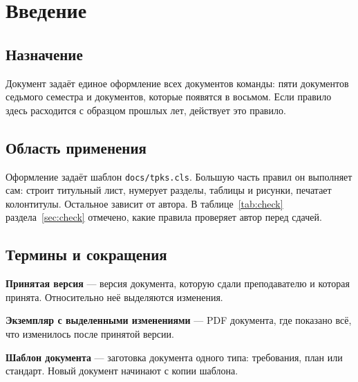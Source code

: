 \documentclass{tpks}
\begin{document}
\makeheader
\begin{changelog}
\end{changelog}

\section{Введение}

\subsection{Назначение}

Документ задаёт единое оформление всех документов команды: пяти документов седьмого семестра и документов, которые появятся в восьмом. Если правило здесь расходится с образцом прошлых лет, действует это правило.

\subsection{Область применения}

Оформление задаёт шаблон \texttt{docs/tpks.cls}. Большую часть правил он выполняет сам: строит титульный лист, нумерует разделы, таблицы и рисунки, печатает колонтитулы. Остальное зависит от автора. В таблице~\ref{tab:check} раздела~\ref{sec:check} отмечено, какие правила проверяет автор перед сдачей.

\subsection{Термины и сокращения}

\textbf{Принятая версия} — версия документа, которую сдали преподавателю и которая принята. Относительно неё выделяются изменения.

\textbf{Экземпляр с выделенными изменениями} — PDF документа, где показано всё, что изменилось после принятой версии.

\textbf{Шаблон документа} — заготовка документа одного типа: требования, план или стандарт. Новый документ начинают с копии шаблона.
\end{document}
